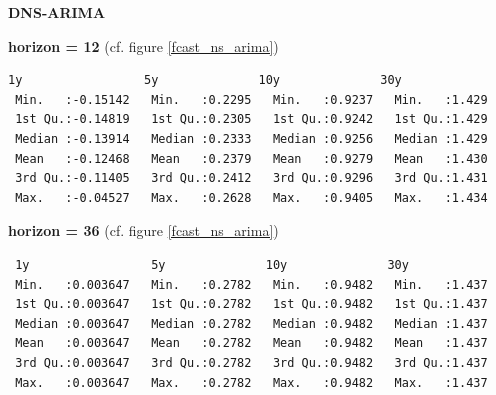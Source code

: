 \textbf{DNS-ARIMA}

\textbf{horizon = 12} (cf. figure \ref{fcast_ns_arima})
\begin{verbatim}
1y                 5y              10y              30y       
 Min.   :-0.15142   Min.   :0.2295   Min.   :0.9237   Min.   :1.429  
 1st Qu.:-0.14819   1st Qu.:0.2305   1st Qu.:0.9242   1st Qu.:1.429  
 Median :-0.13914   Median :0.2333   Median :0.9256   Median :1.429  
 Mean   :-0.12468   Mean   :0.2379   Mean   :0.9279   Mean   :1.430  
 3rd Qu.:-0.11405   3rd Qu.:0.2412   3rd Qu.:0.9296   3rd Qu.:1.431  
 Max.   :-0.04527   Max.   :0.2628   Max.   :0.9405   Max.   :1.434 
\end{verbatim}

\textbf{horizon = 36} (cf. figure \ref{fcast_ns_arima})
\begin{verbatim}
 1y                 5y              10y              30y       
 Min.   :0.003647   Min.   :0.2782   Min.   :0.9482   Min.   :1.437  
 1st Qu.:0.003647   1st Qu.:0.2782   1st Qu.:0.9482   1st Qu.:1.437  
 Median :0.003647   Median :0.2782   Median :0.9482   Median :1.437  
 Mean   :0.003647   Mean   :0.2782   Mean   :0.9482   Mean   :1.437  
 3rd Qu.:0.003647   3rd Qu.:0.2782   3rd Qu.:0.9482   3rd Qu.:1.437  
 Max.   :0.003647   Max.   :0.2782   Max.   :0.9482   Max.   :1.437
\end{verbatim}
